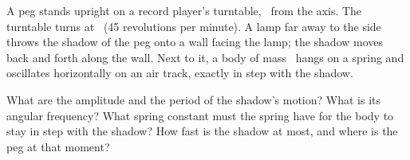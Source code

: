 A peg stands upright on a record player's turntable, \rpO\ from the axis. The turntable turns at \nO\ (45 revolutions per minute). A lamp far away to the side throws the shadow of the peg onto a wall facing the lamp; the shadow moves back and forth along the wall. Next to it, a body of mass \mO\ hangs on a spring and oscillates horizontally on an air track, exactly in step with the shadow.
\begin{abcliste}
\abc What are the amplitude and the period of the shadow's motion?
\abc What is its angular frequency?
\abc What spring constant must the spring have for the body to stay in step with the shadow?
\abc How fast is the shadow at most, and where is the peg at that moment?
\end{abcliste}
